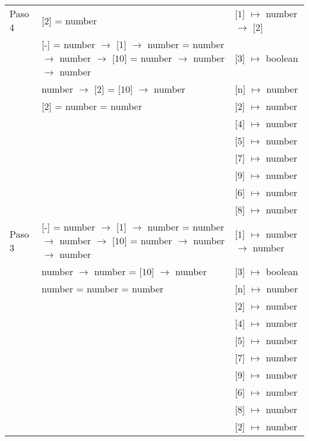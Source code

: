 \documentclass{article}
\begin{document}
\begin{center}
\begin{longtable}{ | l | p{10 cm} | p{5 cm} | }
 Paso 4  & [$\boxed{2}$] = number												& [$\boxed{1}$] $\mapsto$ number $\rightarrow$ [$\boxed{2}$] \\
	 & [-] = number $\rightarrow$ [1] $\rightarrow$ number = number $\rightarrow$ number $\rightarrow$ [$\boxed{10}$] =
	   number $\rightarrow$ number $\rightarrow$ number									& [$\boxed{3}$] $\mapsto$ boolean	\\
	 & number $\rightarrow$ [$\boxed{2}$] = [$\boxed{10}$] $\rightarrow$ number	 					& [n] $\mapsto$ number	\\ 
	 & [$\boxed{2}$] = number = number											& [2] $\mapsto$ number \\ 
	 &	& [$\boxed{4}$] $\mapsto$ number \\
	 &	& [$\boxed{5}$] $\mapsto$ number \\
	 &	& [$\boxed{7}$] $\mapsto$ number \\ 
	 &	& [$\boxed{9}$] $\mapsto$ number \\ 
	 &	& [$\boxed{6}$] $\mapsto$ number \\ 
	 &	& [$\boxed{8}$] $\mapsto$ number \\ \hline
	 
 Paso 3  & [-] = number $\rightarrow$ [1] $\rightarrow$ number = number $\rightarrow$ number $\rightarrow$ [$\boxed{10}$] =
	   number $\rightarrow$ number $\rightarrow$ number								& [$\boxed{1}$] $\mapsto$ number $\rightarrow$ number	\\
	 & number $\rightarrow$ number = [$\boxed{10}$] $\rightarrow$ number	 					& [$\boxed{3}$] $\mapsto$ boolean	\\ 
	 & number = number = number											& [n] $\mapsto$ number \\ 
	 &	& [2] $\mapsto$ number \\
	 &	& [$\boxed{4}$] $\mapsto$ number \\
	 &	& [$\boxed{5}$] $\mapsto$ number \\
	 &	& [$\boxed{7}$] $\mapsto$ number \\ 
	 &	& [$\boxed{9}$] $\mapsto$ number \\ 
	 &	& [$\boxed{6}$] $\mapsto$ number \\ 
	 &	& [$\boxed{8}$] $\mapsto$ number \\ 
	 &	& [$\boxed{2}$] $\mapsto$ number \\ \hline
	 

\end{longtable}
\end{center}
\end{document}
